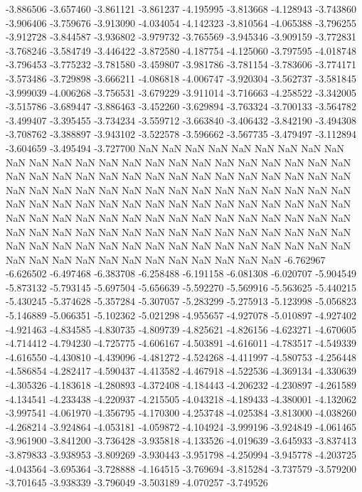-3.886506
-3.657460
-3.861121
-3.861237
-4.195995
-3.813668
-4.128943
-3.743860
-3.906406
-3.759676
-3.913090
-4.034054
-4.142323
-3.810564
-4.065388
-3.796255
-3.912728
-3.844587
-3.936802
-3.979732
-3.765569
-3.945346
-3.909159
-3.772831
-3.768246
-3.584749
-3.446422
-3.872580
-4.187754
-4.125060
-3.797595
-4.018748
-3.796453
-3.775232
-3.781580
-3.459807
-3.981786
-3.781154
-3.783606
-3.774171
-3.573486
-3.729898
-3.666211
-4.086818
-4.006747
-3.920304
-3.562737
-3.581845
-3.999039
-4.006268
-3.756531
-3.679229
-3.911014
-3.716663
-4.258522
-3.342005
-3.515786
-3.689447
-3.886463
-3.452260
-3.629894
-3.763324
-3.700133
-3.564782
-3.499407
-3.395455
-3.734234
-3.559712
-3.663840
-3.406432
-3.842190
-3.494308
-3.708762
-3.388897
-3.943102
-3.522578
-3.596662
-3.567735
-3.479497
-3.112894
-3.604659
-3.495494
-3.727700
NaN
NaN
NaN
NaN
NaN
NaN
NaN
NaN
NaN
NaN
NaN
NaN
NaN
NaN
NaN
NaN
NaN
NaN
NaN
NaN
NaN
NaN
NaN
NaN
NaN
NaN
NaN
NaN
NaN
NaN
NaN
NaN
NaN
NaN
NaN
NaN
NaN
NaN
NaN
NaN
NaN
NaN
NaN
NaN
NaN
NaN
NaN
NaN
NaN
NaN
NaN
NaN
NaN
NaN
NaN
NaN
NaN
NaN
NaN
NaN
NaN
NaN
NaN
NaN
NaN
NaN
NaN
NaN
NaN
NaN
NaN
NaN
NaN
NaN
NaN
NaN
NaN
NaN
NaN
NaN
NaN
NaN
NaN
NaN
NaN
NaN
NaN
NaN
NaN
NaN
NaN
NaN
NaN
NaN
NaN
NaN
NaN
NaN
NaN
NaN
NaN
NaN
NaN
NaN
NaN
NaN
NaN
NaN
NaN
NaN
NaN
NaN
NaN
NaN
NaN
NaN
NaN
NaN
NaN
NaN
NaN
NaN
NaN
NaN
NaN
NaN
-6.762967
-6.626502
-6.497468
-6.383708
-6.258488
-6.191158
-6.081308
-6.020707
-5.904549
-5.873132
-5.793145
-5.697504
-5.656639
-5.592270
-5.569916
-5.563625
-5.440215
-5.430245
-5.374628
-5.357284
-5.307057
-5.283299
-5.275913
-5.123998
-5.056823
-5.146889
-5.066351
-5.102362
-5.021298
-4.955657
-4.927078
-5.010897
-4.927402
-4.921463
-4.834585
-4.830735
-4.809739
-4.825621
-4.826156
-4.623271
-4.670605
-4.714412
-4.794230
-4.725775
-4.606167
-4.503891
-4.616011
-4.783517
-4.549339
-4.616550
-4.430810
-4.439096
-4.481272
-4.524268
-4.411997
-4.580753
-4.256448
-4.586854
-4.282417
-4.590437
-4.413582
-4.467918
-4.522536
-4.369134
-4.330639
-4.305326
-4.183618
-4.280893
-4.372408
-4.184443
-4.206232
-4.230897
-4.261589
-4.134541
-4.233438
-4.220937
-4.215505
-4.043218
-4.189433
-4.380001
-4.132062
-3.997541
-4.061970
-4.356795
-4.170300
-4.253748
-4.025384
-3.813000
-4.038260
-4.268214
-3.924864
-4.053181
-4.059872
-4.104924
-3.999196
-3.924849
-4.061465
-3.961900
-3.841200
-3.736428
-3.935818
-4.133526
-4.019639
-3.645933
-3.837413
-3.879833
-3.938953
-3.809269
-3.930443
-3.951798
-4.250994
-3.945778
-4.203725
-4.043564
-3.695364
-3.728888
-4.164515
-3.769694
-3.815284
-3.737579
-3.579200
-3.701645
-3.938339
-3.796049
-3.503189
-4.070257
-3.749526

